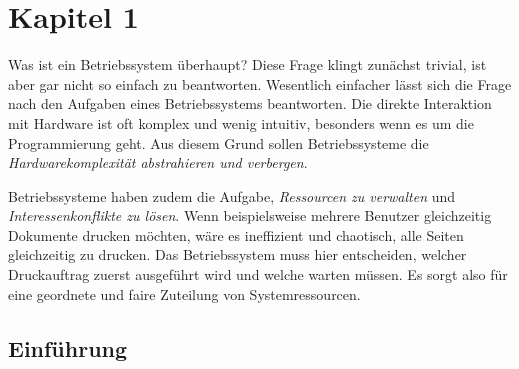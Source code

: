 \chapter{Kapitel 1}

Was ist ein Betriebssystem überhaupt? Diese Frage klingt zunächst trivial, ist aber gar nicht so einfach zu beantworten. Wesentlich einfacher lässt sich die Frage nach den Aufgaben eines Betriebssystems beantworten. Die direkte Interaktion mit Hardware ist oft komplex und wenig intuitiv, besonders wenn es um die Programmierung geht. Aus diesem Grund sollen Betriebssysteme die \textit{Hardwarekomplexität abstrahieren und verbergen}.

Betriebssysteme haben zudem die Aufgabe, \textit{Ressourcen zu verwalten} und \textit{Interessenkonflikte zu lösen}. Wenn beispielsweise mehrere Benutzer gleichzeitig Dokumente drucken möchten, wäre es ineffizient und chaotisch, alle Seiten gleichzeitig zu drucken. Das Betriebssystem muss hier entscheiden, welcher Druckauftrag zuerst ausgeführt wird und welche warten müssen. Es sorgt also für eine geordnete und faire Zuteilung von Systemressourcen.

\section{Einführung}

